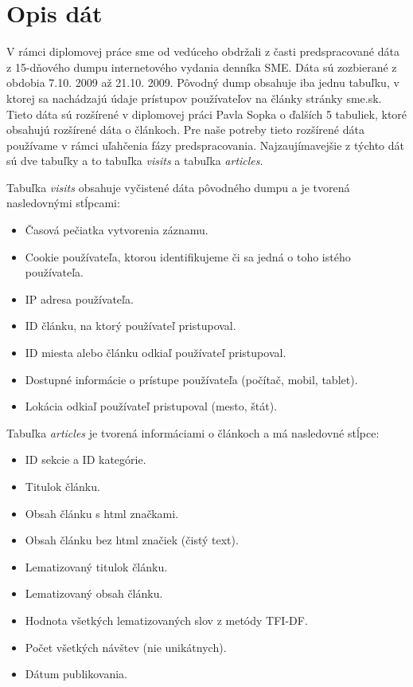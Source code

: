 \documentclass[runningheads,a4paper]{llncs}
\begin{document}
\section{Opis dát}
V rámci diplomovej práce sme od vedúceho obdržali z časti predspracované dáta z 15-dňového dumpu internetového vydania denníka SME.
Dáta sú zozbierané z obdobia 7.10. 2009 až 21.10. 2009.
Pôvodný dump obsahuje iba jednu tabuľku, v ktorej sa nachádzajú údaje prístupov používateľov na články stránky sme.sk.
Tieto dáta sú rozšírené v diplomovej práci Pavla Sopka \cite{diplomovka} o ďalších 5 tabuliek, ktoré obsahujú rozšírené dáta o článkoch.
Pre naše potreby tieto rozšírené dáta používame v rámci uľahčenia fázy predspracovania.
Najzaujímavejšie z týchto dát sú dve tabuľky a to tabuľka {\em visits} a tabuľka {\em articles}.

Tabuľka {\em visits} obsahuje vyčistené dáta pôvodného dumpu a je tvorená nasledovnými stĺpcami:
\begin{itemize}
\renewcommand{\labelitemi}{$\bullet$}
  \item Časová pečiatka vytvorenia záznamu.
  \item Cookie používateľa, ktorou identifikujeme či sa jedná o toho istého používateľa.
  \item IP adresa používateľa.
  \item ID článku, na ktorý používateľ pristupoval.
  \item ID miesta alebo článku odkiaľ používateľ pristupoval.
  \item Dostupné informácie o prístupe používateľa (počítač, mobil, tablet).
  \item Lokácia odkiaľ používateľ pristupoval (mesto, štát).
\end{itemize}

Tabuľka {\em articles} je tvorená informáciami o článkoch a má nasledovné stĺpce:
\begin{itemize}
\renewcommand{\labelitemi}{$\bullet$}
  \item ID sekcie a ID kategórie.
  \item Titulok článku.
  \item Obsah článku s html značkami.
  \item Obsah článku bez html značiek (čistý text).
  \item Lematizovaný titulok článku.
  \item Lematizovaný obsah článku.
  \item Hodnota všetkých lematizovaných slov z metódy TFI-DF.
  \item Počet všetkých návštev (nie unikátnych).
  \item Dátum publikovania.
\end{itemize}
\end{document}
